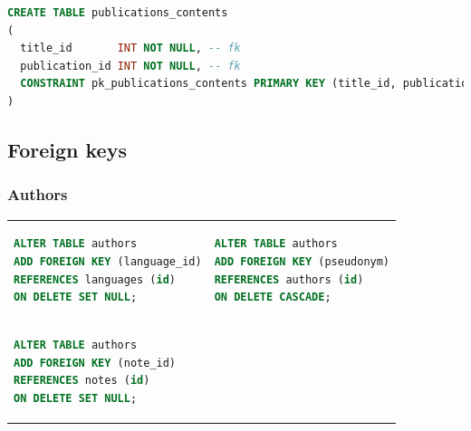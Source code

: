 \documentclass[doubleside, titlepage]{article}
\begin{document}
\newpage

\begin{lstlisting}[language=SQL,showspaces=false,basicstyle=\ttfamily,numberstyle=\tiny,commentstyle=\color{gray}
        ]
CREATE TABLE publications_contents
(
  title_id       INT NOT NULL, -- fk
  publication_id INT NOT NULL, -- fk
  CONSTRAINT pk_publications_contents PRIMARY KEY (title_id, publication_id)
)
\end{lstlisting}


\subsection{Foreign keys}

\subsubsection{Authors}
\begin{tabular}{ ll }
\begin{minipage}{3in}
\begin{lstlisting}[language=SQL,showspaces=false,basicstyle=\ttfamily,numberstyle=\tiny,commentstyle=\color{gray}
        ]
ALTER TABLE authors
ADD FOREIGN KEY (language_id)
REFERENCES languages (id)
ON DELETE SET NULL;
\end{lstlisting}
\end{minipage}
&
\begin{minipage}{3in}
\begin{lstlisting}[language=SQL,showspaces=false,basicstyle=\ttfamily,numberstyle=\tiny,commentstyle=\color{gray}
        ]
ALTER TABLE authors
ADD FOREIGN KEY (pseudonym)
REFERENCES authors (id)
ON DELETE CASCADE;
\end{lstlisting}
\end{minipage}
\\
\begin{minipage}{3in}
\begin{lstlisting}[language=SQL,showspaces=false,basicstyle=\ttfamily,numberstyle=\tiny,commentstyle=\color{gray}
        ]
ALTER TABLE authors
ADD FOREIGN KEY (note_id)
REFERENCES notes (id)
ON DELETE SET NULL;
\end{lstlisting}

\end{minipage}
\end{tabular}
\end{document}
